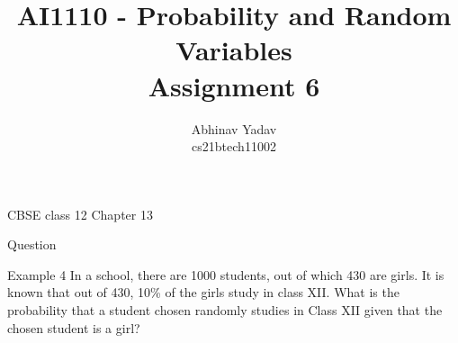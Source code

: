 \documentclass{beamer}
\title{AI1110 - Probability and Random Variables \\
        Assignment 6}
\author{Abhinav Yadav \\ 
        cs21btech11002}
\begin{document}
    \maketitle

    \begin{frame}{CBSE class 12 Chapter 13}
        \begin{section}{Question}
            \begin{block}{Example 4}
            In a school, there are 1000 students, out of which 430 are girls. It is known
            that out of 430, 10\% of the girls study in class XII. What is the probability that a student
            chosen randomly studies in Class XII given that the chosen student is a girl?
            \end{block}
        \end{section}
    \end{frame}
\end{document}
